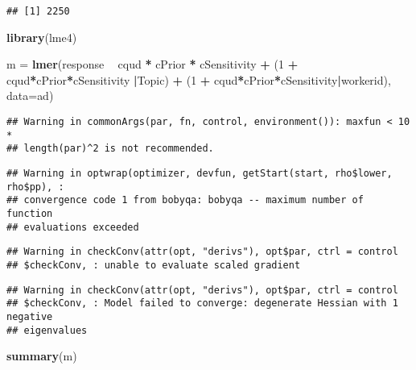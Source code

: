 \documentclass[]{article}
\newenvironment{Shaded}{\begin{snugshade}}{\end{snugshade}}
\newcommand{\KeywordTok}[1]{\textcolor[rgb]{0.13,0.29,0.53}{\textbf{#1}}}
\newcommand{\DataTypeTok}[1]{\textcolor[rgb]{0.13,0.29,0.53}{#1}}
\newcommand{\DecValTok}[1]{\textcolor[rgb]{0.00,0.00,0.81}{#1}}
\newcommand{\StringTok}[1]{\textcolor[rgb]{0.31,0.60,0.02}{#1}}
\newcommand{\OperatorTok}[1]{\textcolor[rgb]{0.81,0.36,0.00}{\textbf{#1}}}
\newcommand{\NormalTok}[1]{#1}
\begin{document}
\begin{verbatim}
## [1] 2250
\end{verbatim}

\begin{Shaded}
\begin{Highlighting}[]
\KeywordTok{library}\NormalTok{(lme4)}

\NormalTok{m =}\StringTok{ }\KeywordTok{lmer}\NormalTok{(response }\OperatorTok{~}\StringTok{ }\NormalTok{cqud }\OperatorTok{*}\StringTok{ }\NormalTok{cPrior }\OperatorTok{*}\StringTok{ }\NormalTok{cSensitivity }\OperatorTok{+}\StringTok{ }\NormalTok{(}\DecValTok{1} \OperatorTok{+}\StringTok{ }\NormalTok{cqud}\OperatorTok{*}\NormalTok{cPrior}\OperatorTok{*}\NormalTok{cSensitivity }\OperatorTok{|}\NormalTok{Topic) }\OperatorTok{+}\StringTok{ }\NormalTok{(}\DecValTok{1} \OperatorTok{+}\StringTok{ }\NormalTok{cqud}\OperatorTok{*}\NormalTok{cPrior}\OperatorTok{*}\NormalTok{cSensitivity}\OperatorTok{|}\NormalTok{workerid), }\DataTypeTok{data=}\NormalTok{ad)}
\end{Highlighting}
\end{Shaded}

\begin{verbatim}
## Warning in commonArgs(par, fn, control, environment()): maxfun < 10 *
## length(par)^2 is not recommended.
\end{verbatim}

\begin{verbatim}
## Warning in optwrap(optimizer, devfun, getStart(start, rho$lower, rho$pp), :
## convergence code 1 from bobyqa: bobyqa -- maximum number of function
## evaluations exceeded
\end{verbatim}

\begin{verbatim}
## Warning in checkConv(attr(opt, "derivs"), opt$par, ctrl = control
## $checkConv, : unable to evaluate scaled gradient
\end{verbatim}

\begin{verbatim}
## Warning in checkConv(attr(opt, "derivs"), opt$par, ctrl = control
## $checkConv, : Model failed to converge: degenerate Hessian with 1 negative
## eigenvalues
\end{verbatim}

\begin{Shaded}
\begin{Highlighting}[]
\KeywordTok{summary}\NormalTok{(m)}
\end{Highlighting}
\end{Shaded}
\end{document}
